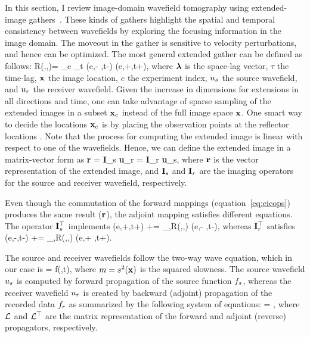 In this section, I review image-domain wavefield tomography 
 using extended-image gathers~\citep{rickett:883,SavaVasconselos}. These kinds of gathers
highlight the spatial and temporal consistency between wavefields by exploring
 the focusing information in the image domain. 
 The moveout in the gather is sensitive to
velocity perturbations, and hence can be optimized. The most
general extended gather can be defined as follows:
\beq
R(\xx,\hh,\tau)= \sum_{{e}} \sum_{t} \US({e},\xx - \hh,t-\tau) \UR({e},\xx+\hh,t+\tau),
\label{eq:eic}
\eeq
 where ${\boldsymbol{\lambda}}$ is the space-lag vector, $\tau$ the time-lag, ${\bf x}$ the image location, $e$ the
experiment index, $u_s$ the 
 source wavefield, and $u_r$ the receiver wavefield. Given the increase in dimensions 
for extensions in all directions and time, one can take advantage of sparse sampling 
of the extended images in a subset ${\bf x}_c$ instead of the full image space ${\bf x}$. One smart
way to  decide the locations ${\bf x}_c$ is by placing the observation points at the reflector
locations \citep{cullison}.  
 Note that the process for computing the extended
image is linear with respect to one of the wavefields. Hence, we can 
define the extended image in a matrix-vector form as 
\beq
  {\bf r} = {\bf I}_{s} {\bf u}_r = {\bf I}_{r} {\bf u}_s,
\label{eq:eicops}
\eeq
where $\bf r$ is the vector representation of the extended image, and 
 ${\bf I}_s$ and ${\bf I}_r$ are the imaging operators for the source and receiver wavefield,
respectively. 

Even though the commutation of the forward mappings (equation~\ref{eq:eicops})
 produces the same result ($\bf r$), the adjoint 
mapping satisfies different equations. The operator ${\bf I}_s^\top$ implements
\beq
  \tilde{\UR}(e,\xx+\hh,t+\tau) += \sum_{\tau,\hh}R(\xx,\hh,\tau) \US(e,\xx - \hh,t-\tau),
\label{eq:adj1}
\eeq
whereas ${\bf I}_r^\top$ satisfies
\beq
  \tilde{\US}(e,\xx-\hh,t-\tau) += \sum_{\tau,\hh}R(\xx,\hh,\tau) \UR(e,\xx + \hh,t+\tau).
\eeq

The source and receiver wavefields follow the two-way wave equation, which in our case
is 
\beq
   = f(\xx,t),
\eeq
where $m=s^2({\bf x})$ is the squared slowness. The source wavefield $u_s$ is computed by forward
propagation of the source function ${f_s}$, whereas the receiver wavefield $u_r$ is created by backward (adjoint)
propagation of the recorded data ${f_r}$ as summarized by the following system of equations:
\beq 
{}
\MAT{ \us \\ \ur} =
\MAT{ \fs \\ \fr} ,
\label{eq:forw}
\eeq
where $\mathcal{L}$ and $\mathcal{L}^\top$ are the matrix representation of the forward and adjoint (reverse) propagators, respectively. 

